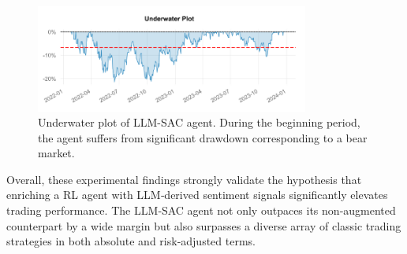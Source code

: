 \begin{figure}
  \centering
  \includegraphics[width=0.8\textwidth]{images/underwater_plot.png}
  \caption{Underwater plot of LLM-SAC agent. During the beginning period, the agent suffers from significant drawdown corresponding to a bear market.}
  \label{fig:underwater_plot}
\end{figure}

Overall, these experimental findings strongly validate the hypothesis that enriching a \gls{RL} agent with \gls{LLM}‑derived sentiment signals significantly elevates trading performance. The LLM‑SAC agent not only outpaces its non‑augmented counterpart by a wide margin but also surpasses a diverse array of classic trading strategies in both absolute and risk‑adjusted terms.
